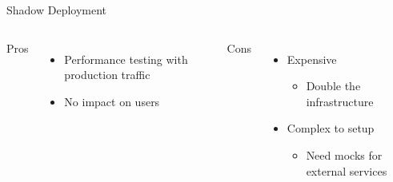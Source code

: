 \documentclass{slide}
\begin{document}
\begin{frame}{Shadow Deployment}
    \vspace{1pt}
    \begin{columns}[t]
      \huge Pros
      {\LARGE
        \begin{itemize}
            \item { Performance testing with production traffic\\}
            \item No impact on users
        \end{itemize}
      }
      \huge Cons
      {\LARGE
        \vspace{3mm}
        \begin{itemize}
            \item Expensive
            \begin{itemize}
                \Large\item Double the infrastructure
            \end{itemize}
            \vspace{2mm}
            \item Complex to setup
            \begin{itemize}
                \Large\item Need mocks for external services
            \end{itemize}
        \end{itemize}
      }
    \end{columns}
\end{frame}
\end{document}
